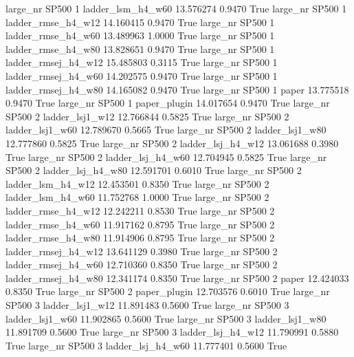   large_nr    SP500                 1   ladder_lsm_h4_w60  13.576274      0.9470    True
  large_nr    SP500                 1  ladder_rmse_h4_w12  14.160415      0.9470    True
  large_nr    SP500                 1  ladder_rmse_h4_w60  13.489963      1.0000    True
  large_nr    SP500                 1  ladder_rmse_h4_w80  13.828651      0.9470    True
  large_nr    SP500                 1 ladder_rmsej_h4_w12  15.485803      0.3115    True
  large_nr    SP500                 1 ladder_rmsej_h4_w60  14.202575      0.9470    True
  large_nr    SP500                 1 ladder_rmsej_h4_w80  14.165082      0.9470    True
  large_nr    SP500                 1               paper  13.775518      0.9470    True
  large_nr    SP500                 1        paper_plugin  14.017654      0.9470    True
  large_nr    SP500                 2     ladder_lsj1_w12  12.766844      0.5825    True
  large_nr    SP500                 2     ladder_lsj1_w60  12.789670      0.5665    True
  large_nr    SP500                 2     ladder_lsj1_w80  12.777860      0.5825    True
  large_nr    SP500                 2   ladder_lsj_h4_w12  13.061688      0.3980    True
  large_nr    SP500                 2   ladder_lsj_h4_w60  12.704945      0.5825    True
  large_nr    SP500                 2   ladder_lsj_h4_w80  12.591701      0.6010    True
  large_nr    SP500                 2   ladder_lsm_h4_w12  12.453501      0.8350    True
  large_nr    SP500                 2   ladder_lsm_h4_w60  11.752768      1.0000    True
  large_nr    SP500                 2  ladder_rmse_h4_w12  12.242211      0.8530    True
  large_nr    SP500                 2  ladder_rmse_h4_w60  11.917162      0.8795    True
  large_nr    SP500                 2  ladder_rmse_h4_w80  11.914906      0.8795    True
  large_nr    SP500                 2 ladder_rmsej_h4_w12  13.641129      0.3980    True
  large_nr    SP500                 2 ladder_rmsej_h4_w60  12.710360      0.8350    True
  large_nr    SP500                 2 ladder_rmsej_h4_w80  12.341174      0.8350    True
  large_nr    SP500                 2               paper  12.424033      0.8350    True
  large_nr    SP500                 2        paper_plugin  12.703576      0.6010    True
  large_nr    SP500                 3     ladder_lsj1_w12  11.891483      0.5600    True
  large_nr    SP500                 3     ladder_lsj1_w60  11.902865      0.5600    True
  large_nr    SP500                 3     ladder_lsj1_w80  11.891709      0.5600    True
  large_nr    SP500                 3   ladder_lsj_h4_w12  11.790991      0.5880    True
  large_nr    SP500                 3   ladder_lsj_h4_w60  11.777401      0.5600    True
